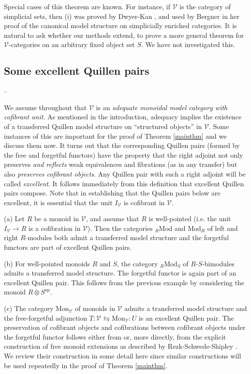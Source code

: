 \documentclass[10pt]{amsart}
\theoremstyle{plain}
\theoremstyle{remark}
\def\Vv{\mathcal{V}}
\def\Mon{\mathrm{Mon}}
\def\Mod{\mathrm{Mod}}
\def\lra{\leftrightarrows}
\def\op{\mathrm{op}}
\begin{document}
Special cases of this theorem are known. For instance, if $\Vv$ is the category of simplicial sets, then (i) was proved by Dwyer-Kan \cite{DK2}, and used by Bergner \cite{Be1} in her proof of the canonical model structure on simplicially enriched categories. It is natural to ask whether our methods extend, to prove a more general theorem for $\Vv$-categories on an arbitrary fixed object set $S$. We have not investigated this.

\subsection{Some excellent Quillen pairs}\label{examples}--\vspace{1ex}

We assume throughout that $\Vv$ is an \emph{adequate monoidal model category with cofibrant unit}. As mentioned in the introduction, adequacy implies the existence of a transferred Quillen model structure on ``structured objects'' in $\Vv$. Some instances of this are important for the proof of Theorem \ref{mainthm} and we discuss them now. It turns out that the corresponding Quillen pairs (formed by the free and forgetful functors) have the property that the right adjoint not only preserves \emph{and reflects} weak equivalences and fibrations (as in any transfer) but also \emph{preserves cofibrant objects}. Any Quillen pair with such a right adjoint will be called \emph{excellent}. It follows immediately from this definition that excellent Quillen pairs compose. Note that in establishing that the Quillen pairs below are excellent, it is essential that the unit $I_\Vv$ is cofibrant in $\Vv$.\vspace{1ex}

(a) Let $R$ be a monoid in $\Vv$, and assume that $R$ is well-pointed (i.e. the unit $I_\Vv\to R$ is a cofibration in $\Vv$). Then the categories ${}_R\Mod$ and $\Mod_R$ of left and right $R$-modules both admit a transferred model structure and the forgetful functors are part of excellent Quillen pairs.\vspace{1ex}

(b) For well-pointed monoids $R$ and $S$, the category ${}_R\Mod_S$ of $R$-$S$-bimodules admits a transferred model structure. The forgetful functor is again part of an excellent Quillen pair. This follows from the previous example by considering the monoid $R\otimes S^\op$.\vspace{1ex}

(c) The category $\Mon_\Vv$ of monoids in $\Vv$ admits a transferred model structure and the free-forgetful adjunction  $T:\Vv\lra\Mon_\Vv:U$ is an excellent Quillen pair. The preservation of cofibrant objects and cofibrations between cofibrant objects under the forgetful functor follows either from \cite[Corollary 5.5]{BM0} or, more directly, from the explicit construction of free monoid extensions as described by Rezk-Schwede-Shipley \cite{SS}. We review their construction in some detail here since similar constructions will be used repeatedly in the proof of Theorem \ref{mainthm}.
\end{document}
